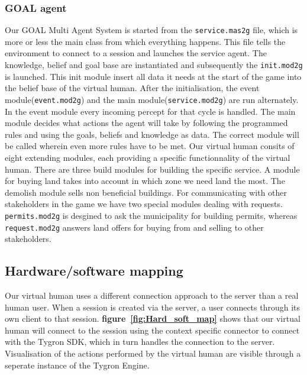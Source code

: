 \subsubsection{GOAL agent}
Our GOAL Multi Agent System is started from the \texttt{service.mas2g} file, which is more or less the main class from which everything happens. This file tells the environment to connect to a session and launches the service agent. The knowledge, belief and goal base are instantiated and subsequently the \texttt{init.mod2g} is launched. This init module insert all data it needs at the start of the game into the belief base of the virtual human. After the initialisation, the event module(\texttt{event.mod2g}) and the main module(\texttt{service.mod2g}) are run alternately. In the event module every incoming percept for that cycle is handled. The main module decides what actions the agent will take by following the programmed rules and using the goals, beliefs and knowledge as data. The correct module will be called wherein even more rules have to be met. Our virtual human consits of eight extending modules, each providing a specific functionnality of the virtual human. There are three build modules for building the specific service. A module for buying land takes into account in which zone we need land the most. The demolish module sells non beneficial buildings. For communicating with other stakeholders in the game we have two special modules dealing with requests. \texttt{permits.mod2g} is desgined to ask the municipality for building permits, whereas \texttt{request.mod2g} answers land offers for buying from and selling to other stakeholders.

\subsection{Hardware/software mapping}
Our virtual human uses a different connection approach to the server than a real human user. When a session is created via the server, a user connects through its own client to that session. \textbf{figure~\ref{fig:Hard_soft_map}} shows that our virtual human will connect to the session using the context specific connector to connect with the Tygron SDK, which in turn handles the connection to the server. Visualisation of the actions performed by the virtual human are visible through a seperate instance of the Tygron Engine.

